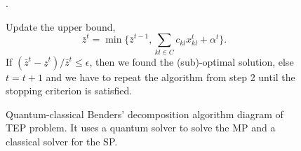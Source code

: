 \begin{figure}
\begin{tcolorbox}[colback=white!5!white,colframe=black!75!black,title=Benders' decomposition algorithm]
\begin{tcolorbox}[colback=red!5!white,colframe=red!75!black,title=\textbf{Step 3:} Slave problem solved by a classical solver]
\begin{mini!}[2]
    .
    \end{mini!}
    \end{tcolorbox}
    \begin{tcolorbox}[colback=black!5!white,colframe=black!75!black,title=\textbf{Step 4:} Stopping criterion]
    Update the upper bound,
    \begin{equation}
    \bar{z}^{t} =\min \{\bar{z}^{t-1}, \sum_{kl\in C}c_{kl}x_{kl}^{t} + \alpha^{t}\}.
    \end{equation}
    If $\left(\bar{z}^{t} - \underline{z}^{t}\right)/\bar{z}^{t}\leq \epsilon$, then we found the (sub)-optimal solution, else $t=t+1$ and we have to repeat the algorithm from step 2 until the stopping criterion is satisfied.
    \end{tcolorbox}
    \end{tcolorbox}
    \caption{Quantum-classical Benders' decomposition algorithm diagram of TEP problem. It uses a quantum solver to solve the MP and a classical solver for the SP.}
    \label{fig:BendersSchemeTEP}
\end{figure}


